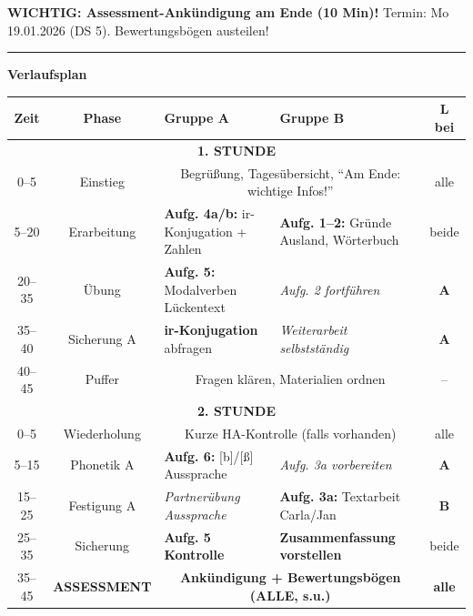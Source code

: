 \documentclass[11pt, a4paper]{article}
\begin{document}
\vspace{0.2cm}

\begin{tcolorbox}[
    colback=wichtig!15,
    colframe=wichtig,
    boxrule=1pt,
    top=2pt, bottom=2pt, left=4pt, right=4pt
]
\footnotesize
\textbf{WICHTIG: Assessment-Ankündigung am Ende (10 Min)!} Termin: Mo 19.01.2026 (DS 5). Bewertungsbögen austeilen!
\end{tcolorbox}

\vspace{0.2cm}
\hrule
\vspace{0.2cm}


\textbf{\large Verlaufsplan}

\vspace{0.2cm}

\footnotesize
\begin{tabularx}{\textwidth}{|c|c|X|X|c|}
\hline
\rowcolor{spanisch!20}
\textbf{Zeit} & \textbf{Phase} & \textbf{Gruppe A} & \textbf{Gruppe B} & \textbf{L bei} \\
\hline
\multicolumn{5}{|c|}{\cellcolor{hellgrau}\textbf{1. STUNDE}} \\
\hline
0--5 & Einstieg & \multicolumn{2}{c|}{Begrüßung, Tagesübersicht, ``Am Ende: wichtige Infos!''} & alle \\
\hline
5--20 & Erarbeitung & \textbf{Aufg. 4a/b:} ir-Konjugation + Zahlen & \textbf{Aufg. 1--2:} Gründe Ausland, Wörterbuch & beide \\
\hline
20--35 & Übung & \textbf{Aufg. 5:} Modalverben Lückentext & \textit{Aufg. 2 fortführen} & \textcolor{gruppeA}{\textbf{A}} \\
\hline
35--40 & Sicherung A & \textbf{ir-Konjugation} abfragen & \textit{Weiterarbeit selbstständig} & \textcolor{gruppeA}{\textbf{A}} \\
\hline
40--45 & Puffer & \multicolumn{2}{c|}{Fragen klären, Materialien ordnen} & -- \\
\hline
\multicolumn{5}{|c|}{\cellcolor{hellgrau}\textbf{2. STUNDE}} \\
\hline
0--5 & Wiederholung & \multicolumn{2}{c|}{Kurze HA-Kontrolle (falls vorhanden)} & alle \\
\hline
5--15 & Phonetik A & \textbf{Aufg. 6:} [b]/[ß] Aussprache & \textit{Aufg. 3a vorbereiten} & \textcolor{gruppeA}{\textbf{A}} \\
\hline
15--25 & Festigung A & \textit{Partnerübung Aussprache} & \textbf{Aufg. 3a:} Textarbeit Carla/Jan & \textcolor{gruppeB}{\textbf{B}} \\
\hline
25--35 & Sicherung & \textbf{Aufg. 5 Kontrolle} & \textbf{Zusammenfassung vorstellen} & beide \\
\hline
\rowcolor{wichtig!20}
35--45 & \textbf{ASSESSMENT} & \multicolumn{2}{c|}{\textbf{Ankündigung + Bewertungsbögen (ALLE, s.u.)}} & \textbf{alle} \\
\hline
\end{tabularx}
\end{document}
